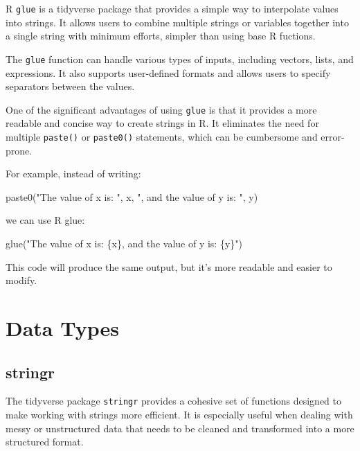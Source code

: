 \documentclass[
]{book}
\newenvironment{Shaded}{\begin{snugshade}}{\end{snugshade}}
\newcommand{\FunctionTok}[1]{\textcolor[rgb]{0.00,0.00,0.00}{#1}}
\newcommand{\NormalTok}[1]{#1}
\newcommand{\StringTok}[1]{\textcolor[rgb]{0.31,0.60,0.02}{#1}}
\begin{document}
R \texttt{glue} is a tidyverse package that provides a simple way to interpolate values into strings. It allows users to combine multiple strings or variables together into a single string with minimum efforts, simpler than using base R fuctions.

The \texttt{glue} function can handle various types of inputs, including vectors, lists, and expressions. It also supports user-defined formats and allows users to specify separators between the values.

One of the significant advantages of using \texttt{glue} is that it provides a more readable and concise way to create strings in R. It eliminates the need for multiple \texttt{paste()} or \texttt{paste0()} statements, which can be cumbersome and error-prone.

For example, instead of writing:

\begin{Shaded}
\begin{Highlighting}[]
\FunctionTok{paste0}\NormalTok{(}\StringTok{"The value of x is: "}\NormalTok{, x, }\StringTok{", and the value of y is: "}\NormalTok{, y)}
\end{Highlighting}
\end{Shaded}

we can use R glue:

\begin{Shaded}
\begin{Highlighting}[]
\FunctionTok{glue}\NormalTok{(}\StringTok{"The value of x is: \{x\}, and the value of y is: \{y\}"}\NormalTok{)}
\end{Highlighting}
\end{Shaded}

This code will produce the same output, but it's more readable and easier to modify.

\hypertarget{data-types}{%
\section{Data Types}\label{data-types}}

\hypertarget{stringr}{%
\subsection*{stringr}\label{stringr}}

The tidyverse package \texttt{stringr} provides a cohesive set of functions designed to make working with strings more efficient. It is especially useful when dealing with messy or unstructured data that needs to be cleaned and transformed into a more structured format.
\end{document}
